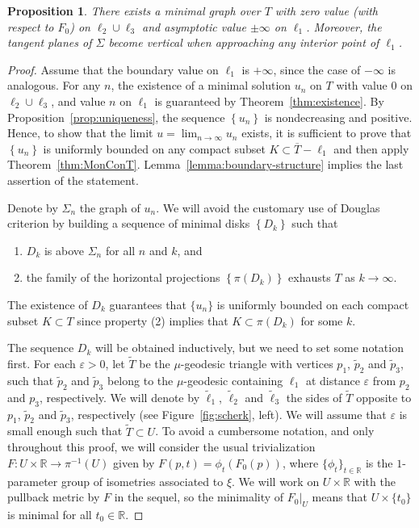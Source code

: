 \documentclass[a4paper,10pt,reqno]{amsart}
\newcommand{\R}{\mathbb{R}}
\newcommand{\sm}{-}
\newtheorem{proposition}[theorem]{Proposition}
\theoremstyle{definition}
\theoremstyle{remark}
\numberwithin{equation}{section}
\begin{document}
\begin{proposition}\label{prop:scherk} 
There exists a minimal graph over $T$ with zero value (with respect to $F_0$) on $\ell_2\cup\ell_3$ and asymptotic value $\pm\infty$ on $\ell_1$. Moreover, the tangent planes of $\Sigma$ become vertical when approaching any interior point of $\ell_1$.
\end{proposition}

	
\begin{proof}
Assume that the boundary value on $\ell_1$ is $+\infty$, since the case of $-\infty$ is analogous. For any $n$, the existence of a minimal solution $u_n$ on $T$ with value $0$ on $\ell_2\cup\ell_3$, and value $n$ on $\ell_1$ is guaranteed by Theorem~\ref{thm:existence}. By Proposition~\ref{prop:uniqueness}, the sequence $\left\{u_n\right\}$ is nondecreasing and positive. Hence, to show that the limit $u=\lim_{n\to\infty}u_n$ exists, it is sufficient to prove that $\left\{u_n\right\}$ is uniformly bounded on any compact subset $K\subset\overline{T}\sm\ell_1$ and then apply Theorem~\ref{thm:MonConT}. Lemma~\ref{lemma:boundary-structure} implies the last assertion of the statement.

Denote by $\Sigma_n$ the graph of $u_n$. We will avoid the customary use of Douglas criterion by building a sequence of minimal disks $\left\{D_k\right\}$ such that
\begin{enumerate}
	\item $D_k$ is above $\Sigma_n$ for all $n$ and $k$, and
	\item the family of the horizontal projections $\left\{\pi(D_k)\right\}$ exhausts $T$ as $k\to\infty$.
\end{enumerate} 
The existence of $D_k$ guarantees that $\{u_n\}$ is uniformly bounded on each compact subset $K\subset T$ since property (2) implies that $K\subset\pi(D_k)$ for some $k$.

The sequence $D_k$ will be obtained inductively, but we need to set some notation first. For each $\varepsilon>0$, let $\widetilde T$ be the $\mu$-geodesic triangle with vertices $p_1$, $\tilde{p}_2$ and $\tilde{p}_3$, such that $\tilde{p}_2$ and $\tilde{p}_3$ belong to the $\mu$-geodesic containing $\ell_1$ at distance $\varepsilon$ from $p_2$ and $p_3$, respectively. We will denote by $\tilde{\ell}_1$, $\tilde{\ell}_2$ and $\tilde{\ell}_3$ the sides of $\widetilde{T}$ opposite to $p_1$, $\tilde{p}_2$ and $\tilde{p}_3$, respectively (see Figure~\ref{fig:scherk}, left). We will assume that $\varepsilon$ is small enough such that $\widetilde T\subset U$. To avoid a cumbersome notation, and only throughout this proof, we will consider the usual trivialization $F:U\times\R\to\pi^{-1}(U)$ given by $F(p,t)=\phi_t(F_0(p))$, where $\{\phi_t\}_{t\in\R}$ is the $1$-parameter group of isometries associated to $\xi$. We will work on $U\times\R$ with the pullback metric by $F$ in the sequel, so the minimality of $F_0|_U$ means that $U\times\{t_0\}$ is minimal for all $t_0\in\R$.


\end{proof}
\end{document}

